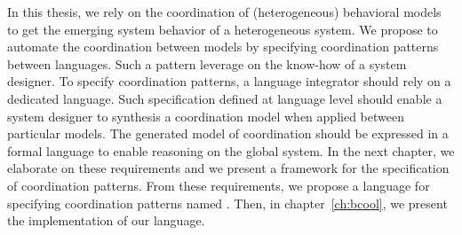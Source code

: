 In this thesis, we rely on the coordination of (heterogeneous) behavioral models to get the emerging system behavior of a heterogeneous system. We propose to automate the coordination between models by specifying coordination patterns between languages. Such a pattern leverage on the know-how of a system designer. To specify coordination patterns, a language integrator should rely on a dedicated language. Such specification defined at language level should enable a system designer to synthesis a coordination model when applied between particular models. The generated model of coordination should be expressed in a formal language to enable reasoning on the global system. In the next chapter, we elaborate on these requirements and we present a framework for the specification of coordination patterns. From these requirements, we propose a language for specifying coordination patterns named \bcool. Then, in chapter~\ref{ch:bcool}, we present the implementation of our language.









